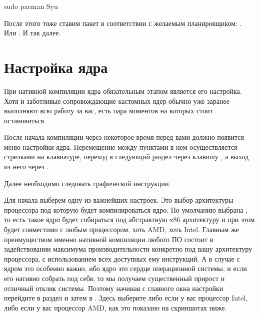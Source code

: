 \documentclass[letterpaper,10pt,russian,openany]{sphinxmanual}
\begin{document}
\begin{sphinxVerbatim}[commandchars=\\\{\}]
sudo pacman \PYGZhy{}Syu
\end{sphinxVerbatim}

\sphinxAtStartPar
После этого тоже ставим пакет в соответствии с желаемым планировщиком: .
Или . И так далее.

\ignorespaces 

\section{Настройка ядра}
\label{\detokenize{source/custom-kernels:manual-kernel-configuration}}\label{\detokenize{source/custom-kernels:index-6}}\label{\detokenize{source/custom-kernels:id9}}
\sphinxAtStartPar
При нативной компиляции ядра обязательным этапом является его настройка.
Хотя и заботливые сопровождающие кастомных ядер обычно уже заранее выполняют
всю работу за вас, есть пара моментов на которых стоит остановиться.

\sphinxAtStartPar
После начала компиляции через некоторое время перед вами должно появится меню настройки ядра.
Перемещение между пунктами в нем осуществляется стрелками на клавиатуре, переход в
следующий раздел через клавишу , а выход из него через .

\sphinxAtStartPar
Далее необходимо следовать графической инструкции.

\sphinxAtStartPar
{} Для начала выберем одну из важнейших настроек. Это выбор архитектуры процессора под которую будет компилироваться ядро.
По умолчанию выбрана , то есть такое ядро будет собираться под абстрактную x86 архитектуру и при этом будет совместимо
с любым процессором, хоть AMD, хоть Intel. Главным же преимуществом именно нативной компиляции любого ПО состоит в задействовании
максимума производительности конкретно под вашу архитектуру процессора, с использованием всех доступных ему инструкций. А в случае
с ядром это особенно важно, ибо ядро это сердце операционной системы, и если его нативно собрать под себя, то мы получаем существенный
прирост и отличный отклик системы. Поэтому начиная с главного окна настройки перейдите в раздел  и затем
в . Здесь выберите либо  если у вас процессор Intel, либо  если
у вас процессор AMD, как это показано на скриншотах ниже.
\end{document}
